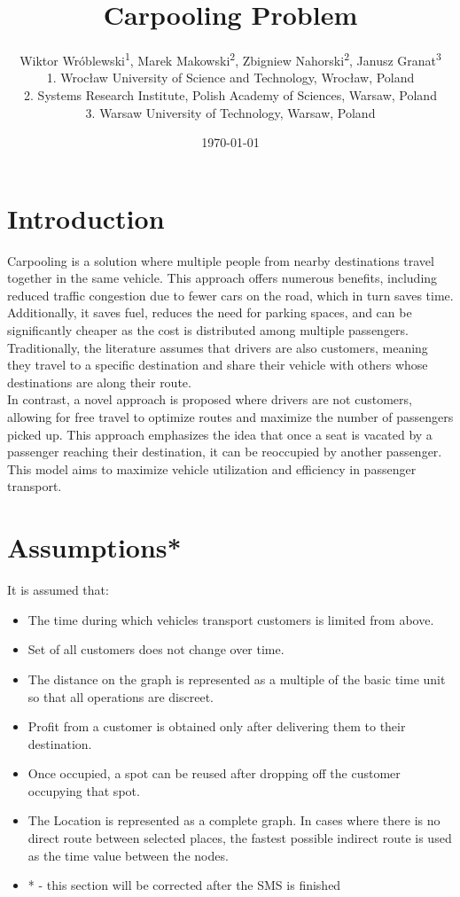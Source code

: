 \documentclass{article}
\title{Carpooling Problem}
\author{
 Wiktor Wróblewski\textsuperscript{1}, Marek Makowski\textsuperscript{2}, Zbigniew Nahorski\textsuperscript{2}, Janusz Granat\textsuperscript{3}\\
 1. Wrocław University of Science and Technology, Wrocław, Poland\\
 2. Systems Research Institute, Polish Academy of Sciences, Warsaw, Poland\\
 3. Warsaw University of Technology, Warsaw, Poland
}
\date{\today}
\begin{document}
\maketitle
\linenumbers

\section{Introduction}
Carpooling is a solution where multiple people from nearby destinations travel together in the same vehicle. This approach offers numerous benefits, including reduced traffic congestion due to fewer cars on the road, which in turn saves time. Additionally, it saves fuel, reduces the need for parking spaces, and can be significantly cheaper as the cost is distributed among multiple passengers. Traditionally, the literature assumes that drivers are also customers, meaning they travel to a specific destination and share their vehicle with others whose destinations are along their route.\\
In contrast, a novel approach is proposed where drivers are not customers, allowing for free travel to optimize routes and maximize the number of passengers picked up. This approach emphasizes the idea that once a seat is vacated by a passenger reaching their destination, it can be reoccupied by another passenger. This model aims to maximize vehicle utilization and efficiency in passenger transport.

\section{Assumptions*}
It is assumed that:
\begin{itemize}[left=0pt]
    \item The time during which vehicles transport customers is limited from above.
    \item Set of all customers does not change over time.
    \item The distance on the graph is represented as a multiple of the basic time unit so that all operations are discreet.
    \item Profit from a customer is obtained only after delivering them to their destination.
    \item Once occupied, a spot can be reused after dropping off the customer occupying that spot.
    \item The Location is represented as a complete graph. In cases where there is no direct route between selected places, the fastest possible indirect route is used as the time value between the nodes.
    \item * - this section will be corrected after the SMS is finished
\end{itemize}
\end{document}
